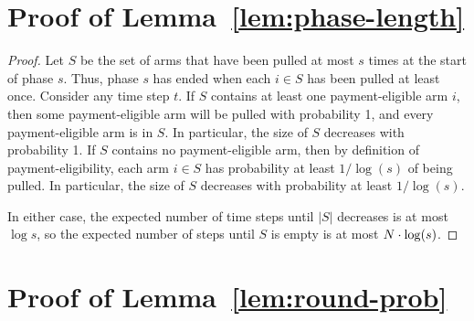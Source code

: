 \section{Proof of Lemma~\ref{lem:phase-length}}
\label{sec:lemma4-proof}

\begin{proof}
Let $S$ be the set of arms that have been pulled at most
$s$ times at the start of phase $s$.
Thus, phase $s$ has ended when each $i \in S$ has been pulled at least once.
Consider any time step $t$.
If $S$ contains at least one payment-eligible arm $i$,
then some payment-eligible arm will be pulled with probability 1,
and every payment-eligible arm is in $S$.
In particular, the size of $S$ decreases with probability 1.
If $S$ contains no payment-eligible arm,
then by definition of payment-eligibility,
each arm $i \in S$ has probability at least $1/\log(s)$ of being pulled.
In particular, the size of $S$ decreases with probability at least $1/\log(s)$.

In either case, the expected number of time steps until
$|S|$ decreases is at most $\log s$,
so the expected number of steps until $S$ is empty is at most
$N \cdot \log(s)$.
\end{proof}







\section{Proof of Lemma~\ref{lem:round-prob}}
\label{sec:lemma5-proof}

